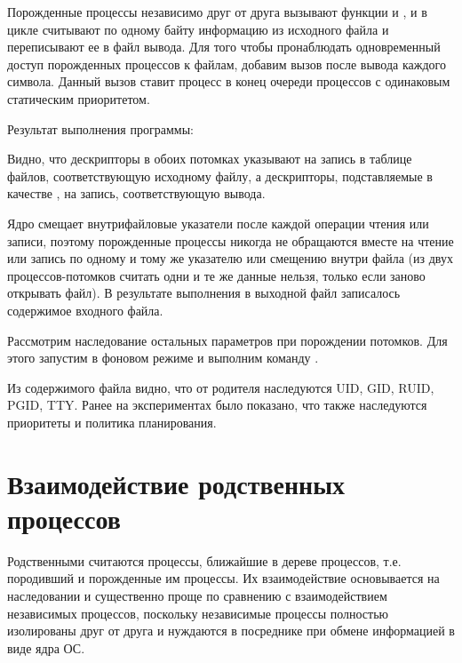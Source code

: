 Порожденные процессы независимо друг от друга вызывают функции  и , и в цикле считывают по одному байту информацию из исходного файла и переписывают ее в файл вывода. Для того чтобы пронаблюдать одновременный доступ порожденных процессов к файлам, добавим вызов  после вывода каждого символа. Данный вызов ставит процесс в конец очереди процессов с одинаковым статическим приоритетом.





Результат выполнения программы:



Видно, что дескрипторы  в обоих потомках указывают на запись в таблице файлов, соответствующую исходному файлу, а дескрипторы, подставляемые в качестве , на запись, соответствующую  вывода.

Ядро смещает внутрифайловые указатели после каждой операции чтения или записи, поэтому порожденные процессы никогда не обращаются вместе на чтение или запись по одному и тому же указателю или смещению внутри файла (из двух процессов-потомков считать одни и те же данные нельзя, только если заново открывать файл). В результате выполнения в выходной файл записалось содержимое входного файла.

Рассмотрим наследование остальных параметров при порождении потомков. Для этого запустим  в фоновом режиме и выполним команду .



Из содержимого файла  видно, что от родителя наследуются UID, GID, RUID, PGID, TTY. Ранее на экспериментах было показано, что также наследуются приоритеты и политика планирования.

\section{Взаимодействие родственных процессов}

Родственными считаются процессы, ближайшие в дереве процессов, т.е. породивший и порожденные им процессы. Их взаимодействие основывается на наследовании и существенно проще по сравнению с взаимодействием независимых процессов, поскольку независимые процессы полностью изолированы друг от друга и нуждаются в посреднике при обмене информацией в виде ядра ОС. 

